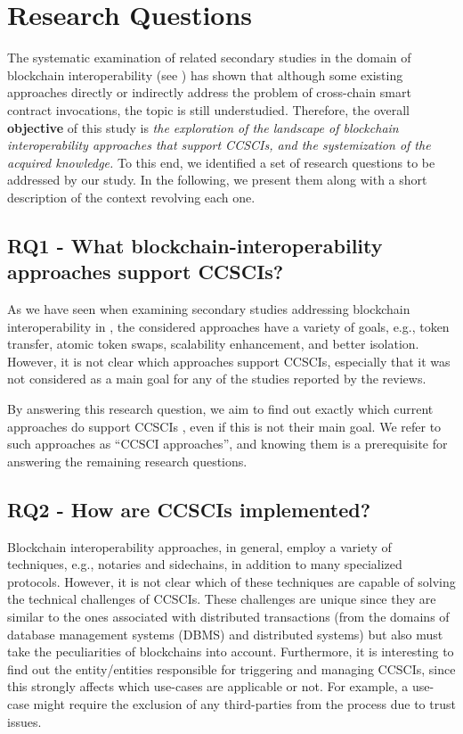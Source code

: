 \documentclass[review]{elsarticle}
\begin{document}
\section{Research Questions}
\label{sec:research-questions}
The systematic examination of related secondary studies in the domain of blockchain interoperability (see ) has shown that although some existing approaches directly or indirectly address the problem of cross-chain smart contract invocations, the topic is still understudied.
Therefore, the overall \textbf{objective} of this study is \textit{the exploration of the landscape of blockchain interoperability approaches that support CCSCIs, and the systemization of the acquired knowledge.}
To this end, we identified a set of research questions to be addressed by our study.
In the following, we present them along with a short description of the context revolving each one.

\subsection*{RQ1 - What blockchain-interoperability approaches support CCSCIs?}
As we have seen when examining secondary studies addressing blockchain interoperability in , the considered approaches have a variety of goals, e.g., token transfer, atomic token swaps, scalability enhancement, and better isolation.
However, it is not clear which approaches support CCSCIs, especially that it was not considered as a main goal for any of the studies reported by the reviews.

By answering this research question, we aim to find out exactly which current approaches do support CCSCIs %
, even if this is not their main goal.
We refer to such approaches as \enquote{CCSCI approaches}, and knowing them is a prerequisite for answering the remaining research questions.

\subsection*{RQ2 - How are CCSCIs implemented?}
Blockchain interoperability approaches, in general, employ a variety of techniques, e.g., notaries and sidechains, in addition to many specialized protocols.
However, it is not clear which of these techniques are capable of solving the technical challenges of CCSCIs.
These challenges are unique since they are similar to the ones associated with distributed transactions (from the domains of database management systems (DBMS) and distributed systems) but also must take the peculiarities of blockchains into account.
Furthermore, it is interesting to find out the entity/entities responsible for triggering and managing CCSCIs, since this strongly affects which use-cases are applicable or not.
For example, a use-case might require the exclusion of any third-parties from the process due to trust issues.
\end{document}
